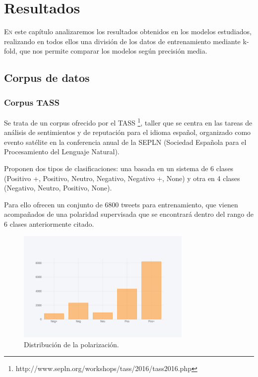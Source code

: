 
\chapter{Resultados}

\lettrine{E}{n} este capítulo analizaremos los resultados obtenidos en los modelos estudiados, realizando en todos ellos una división de los datos de entrenamiento mediante k-fold, que nos permite comparar los modelos según precisión media.

\section{Corpus de datos}\label{corpus}

\subsection{Corpus TASS}
Se trata de un corpus ofrecido por el TASS \footnote{http://www.sepln.org/workshops/tass/2016/tass2016.php}, taller que se centra en las tareas de análisis de sentimientos y de reputación para el idioma español, organizado como evento satélite en la conferencia anual de la SEPLN (Sociedad Española para el Procesamiento del Lenguaje Natural).

Proponen dos tipos de clasificaciones: una basada en un sistema de 6 clases (Positivo +, Positivo, Neutro, Negativo, Negativo +, None) y otra en 4 clases (Negativo, Neutro, Positivo, None).

Para ello ofrecen un conjunto de 6800 tweets para entrenamiento, que vienen acompañados de una polaridad supervisada que se encontrará dentro del rango de 6 clases anteriormente citado.

\begin{figure}[!ht]
	\centering
	\includegraphics[width=0.75\textwidth]{imaxes/distTass.png}
	\caption{Distribución de la polarización.}
	\label{dist_tass}
\end{figure}

